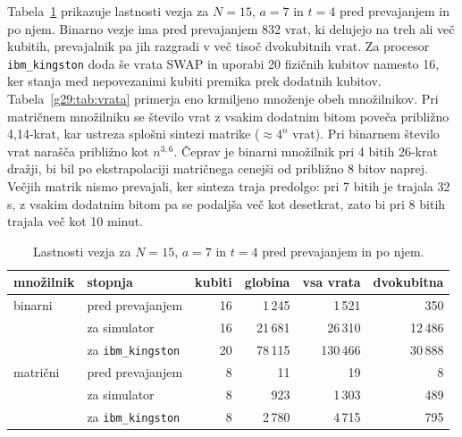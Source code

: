  Tabela~\ref{g29:tab:prevajanje} prikazuje lastnosti vezja za $N = 15$, $a = 7$ in $t = 4$ pred prevajanjem in po njem. Binarno vezje ima pred prevajanjem 832 vrat, ki delujejo na treh ali več kubitih, prevajalnik pa jih razgradi v več tisoč dvokubitnih vrat. Za procesor \texttt{ibm\_kingston} doda še vrata SWAP in uporabi 20 fizičnih kubitov namesto 16, ker stanja med nepovezanimi kubiti premika prek dodatnih kubitov. Tabela~\ref{g29:tab:vrata} primerja eno krmiljeno množenje obeh množilnikov. Pri matričnem množilniku se število vrat z vsakim dodatnim bitom poveča približno 4,14-krat, kar ustreza splošni sintezi matrike ($\approx 4^n$ vrat). Pri binarnem število vrat narašča približno kot $n^{3{,}6}$. Čeprav je binarni množilnik pri 4 bitih 26-krat dražji, bi bil po ekstrapolaciji matričnega cenejši od približno 8 bitov naprej. Večjih matrik nismo prevajali, ker sinteza traja predolgo: pri 7 bitih je trajala 32\,s, z vsakim dodatnim bitom pa se podaljša več kot desetkrat, zato bi pri 8 bitih trajala več kot 10 minut.

\begin{table}[htbp]
\caption{Lastnosti vezja za $N = 15$, $a = 7$ in $t = 4$ pred prevajanjem in po njem.}
\label{g29:tab:prevajanje}
\centering
\footnotesize
\setlength{\tabcolsep}{5pt}
\renewcommand{\arraystretch}{1.35}
\begin{tabular}{llrrrr}
\toprule
množilnik & stopnja & kubiti & globina & vsa vrata & dvokubitna \\
\midrule
binarni & pred prevajanjem & 16 & 1\,245 & 1\,521 & 350 \\
 & za simulator & 16 & 21\,681 & 26\,310 & 12\,486 \\
 & za \texttt{ibm\_kingston} & 20 & 78\,115 & 130\,466 & 30\,888 \\
\addlinespace
matrični & pred prevajanjem & 8 & 11 & 19 & 8 \\
 & za simulator & 8 & 923 & 1\,303 & 489 \\
 & za \texttt{ibm\_kingston} & 8 & 2\,780 & 4\,715 & 795 \\
\bottomrule
\end{tabular}
\end{table}


